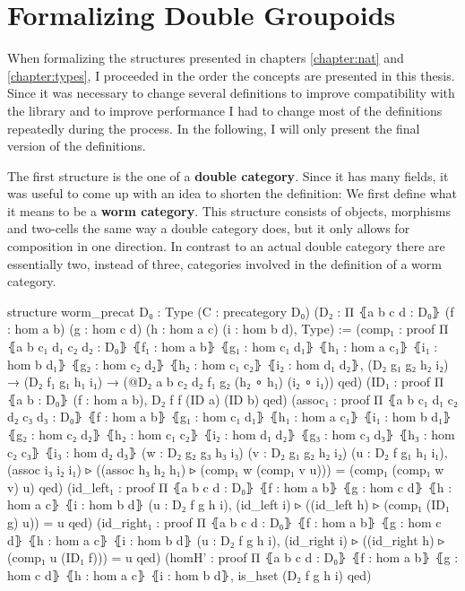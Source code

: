 \section{Formalizing Double Groupoids}

When formalizing the structures presented in chapters \ref{chapter:nat} and
\ref{chapter:types}, I proceeded in the order the concepts are presented in this
thesis.
Since it was necessary to change several definitions to improve compatibility with
the library and to improve performance I had to change most of the definitions
repeatedly during the process.
In the following, I will only present the final version of the definitions.

The first structure is the one of a \textbf{double category}.
Since it has many fields, it was useful to come up with an idea to shorten the definition:
We first define what it means to be a \textbf{worm category}.
This structure consists of objects, morphisms and two-cells the same way a double
category does, but it only allows for composition in one direction.
In contrast to an actual double category there are essentially two, instead of
three, categories involved in the definition of a worm category.
\begin{leancodebr}
structure worm_precat {D₀ : Type} (C  : precategory D₀)
  (D₂ : Π ⦃a b c d : D₀⦄
    (f : hom a b) (g : hom c d) (h : hom a c) (i : hom b d), Type) :=
  (comp₁ : proof Π ⦃a b c₁ d₁ c₂ d₂ : D₀⦄
    ⦃f₁ : hom a b⦄ ⦃g₁ : hom c₁ d₁⦄ ⦃h₁ : hom a c₁⦄ ⦃i₁ : hom b d₁⦄
    ⦃g₂ : hom c₂ d₂⦄ ⦃h₂ : hom c₁ c₂⦄ ⦃i₂ : hom d₁ d₂⦄,
    (D₂ g₁ g₂ h₂ i₂) → (D₂ f₁ g₁ h₁ i₁)
    → (@D₂ a b c₂ d₂ f₁ g₂ (h₂ ∘ h₁) (i₂ ∘ i₁)) qed)
  (ID₁ : proof Π ⦃a b : D₀⦄ (f : hom a b), D₂ f f (ID a) (ID b) qed)
  (assoc₁ : proof Π ⦃a b c₁ d₁ c₂ d₂ c₃ d₃ : D₀⦄
    ⦃f  : hom a b⦄   ⦃g₁ : hom c₁ d₁⦄ ⦃h₁ : hom a c₁⦄ ⦃i₁ : hom b d₁⦄
    ⦃g₂ : hom c₂ d₂⦄ ⦃h₂ : hom c₁ c₂⦄ ⦃i₂ : hom d₁ d₂⦄
    ⦃g₃ : hom c₃ d₃⦄ ⦃h₃ : hom c₂ c₃⦄ ⦃i₃ : hom d₂ d₃⦄
    (w : D₂ g₂ g₃ h₃ i₃) (v : D₂ g₁ g₂ h₂ i₂) (u : D₂ f g₁ h₁ i₁),
    (assoc i₃ i₂ i₁) ▹ ((assoc h₃ h₂ h₁) ▹
        (comp₁ w (comp₁ v u))) = (comp₁ (comp₁ w v) u) qed)
  (id_left₁ : proof Π ⦃a b c d : D₀⦄
    ⦃f : hom a b⦄ ⦃g : hom c d⦄ ⦃h : hom a c⦄ ⦃i : hom b d⦄
    (u : D₂ f g h i),
    (id_left i) ▹ ((id_left h) ▹ (comp₁ (ID₁ g) u)) = u qed)
  (id_right₁ : proof Π ⦃a b c d : D₀⦄
    ⦃f : hom a b⦄ ⦃g : hom c d⦄ ⦃h : hom a c⦄ ⦃i : hom b d⦄
    (u : D₂ f g h i),
    (id_right i) ▹ ((id_right h) ▹ (comp₁ u (ID₁ f))) = u qed)
  (homH' : proof Π ⦃a b c d : D₀⦄
    ⦃f : hom a b⦄ ⦃g : hom c d⦄ ⦃h : hom a c⦄ ⦃i : hom b d⦄,
    is_hset (D₂ f g h i) qed)
\end{leancodebr}

